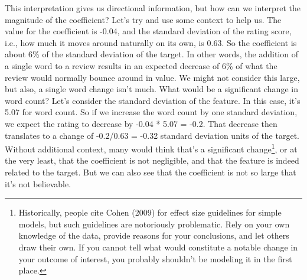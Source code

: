 \documentclass[
  letterpaper,
]{krantz}
\begin{document}
This interpretation gives us directional information, but how can we
interpret the magnitude of the coefficient? Let's try and use some
context to help us. The value for the coefficient is -0.04, and the
standard deviation of the rating score, i.e., how much it moves around
naturally on its own, is 0.63. So the coefficient is about 6\% of the
standard deviation of the target. In other words, the addition of a
single word to a review results in an expected decrease of 6\% of what
the review would normally bounce around in value. We might not consider
this large, but also, a single word change isn't much. What would be a
significant change in word count? Let's consider the standard deviation
of the feature. In this case, it's 5.07 for word count. So if we
increase the word count by one standard deviation, we expect the rating
to decrease by -0.04 * 5.07 = -0.2. That decrease then translates to a
change of -0.2/0.63 = -0.32 standard deviation units of the target.
Without additional context, many would think that's a significant
change\footnote{Historically, people cite Cohen (2009) for effect size
  guidelines for simple models, but such guidelines are notoriously
  problematic. Rely on your own knowledge of the data, provide reasons
  for your conclusions, and let others draw their own. If you cannot
  tell what would constitute a notable change in your outcome of
  interest, you probably shouldn't be modeling it in the first place.},
or at the very least, that the coefficient is not negligible, and that
the feature is indeed related to the target. But we can also see that
the coefficient is not so large that it's not believable.
\end{document}
